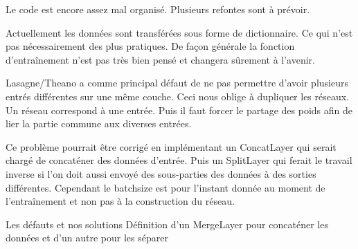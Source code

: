 Le code est encore assez mal organisé. Plusieurs refontes sont à prévoir.

Actuellement les données sont transférées sous forme de dictionnaire. Ce qui 
n'est pas nécessairement des plus pratiques. De façon générale la fonction 
d'entraînement n'est pas très bien pensé et changera sûrement à l'avenir.

Lasagne/Theano a comme principal défaut de ne pas permettre d'avoir plusieurs
entrés différentes sur une même couche. Ceci nous oblige à dupliquer les réseaux.
Un réseau correspond à une entrée. Puis il faut forcer le partage des poids afin
de lier la partie commune aux diverses entrées.

Ce problème pourrait être corrigé en implémentant un ConcatLayer qui serait chargé
de concaténer des données d'entrée. Puis un SplitLayer qui ferait le travail inverse
si l'on doit aussi envoyé des sous-parties des données à des sorties différentes.
Cependant le batchsize est pour l'instant donnée au moment de l'entraînement
et non pas à la construction du réseau.

\TODO Les défauts et nos solutions
\TODO Définition d'un MergeLayer pour concaténer les données et d'un autre
pour les séparer

